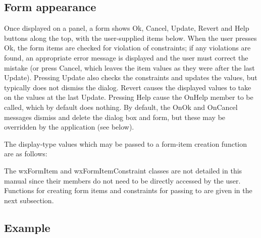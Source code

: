 \subsection{Form appearance}

Once displayed on a panel, a form shows Ok, Cancel, Update, Revert and
Help buttons along the top, with the user-supplied items below. When the
user presses Ok, the form items are checked for violation of
constraints; if any violations are found, an appropriate error message
is displayed and the user must correct the mistake (or press Cancel,
which leaves the item values as they were after the last Update).
Pressing Update also checks the constraints and updates the values, but
typically does not dismiss the dialog. Revert causes the displayed
values to take on the values at the last Update. Pressing Help cause the
OnHelp member to be called, which by default does nothing. By default,
the OnOk and OnCancel messages dismiss and delete the dialog box and
form, but these may be overridden by the application (see below).

The display-type values which may be passed to a form-item creation
function are as follows:

\begin{twocollist}\itemsep=0pt
\end{twocollist}

The wxFormItem and wxFormItemConstraint classes are not detailed in this
manual since their members do not need to be directly accessed by the
user. Functions for creating form items and constraints for passing to
 are given in the next subsection.

\subsection{Example}

